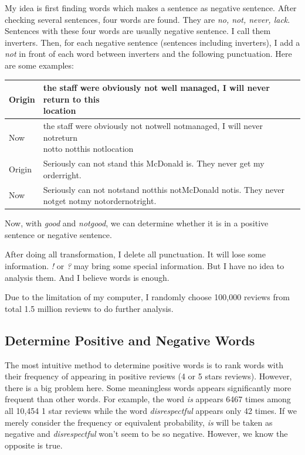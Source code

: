 \documentclass[UTF8]{article}
\begin{document}
My idea is first finding words which makes a sentence as negative sentence. After checking several sentences, four words are found. They are \textit{no, not, never, lack}. Sentences with these four words are usually negative sentence. I call them inverters. Then, for each negative sentence (sentences including inverters), I add a \textit{not} in front of each word between inverters and the following punctuation. Here are some examples:

\begin{table}[]
    \begin{tabular}{|l|l|}
    \hline
    Origin & \makecell{the staff were obviously not well managed, I will never return to this \\location}               
    \\ \hline
    Now    & \makecell{the staff were obviously not notwell notmanaged, I will never notreturn \\notto notthis notlocation }\\ 
    \hline
    Origin & Seriously can not stand this McDonald is. They never get my orderright.  \\ 
    \hline
    Now    & \makecell{Seriously can not notstand notthis notMcDonald notis. They never \\notget notmy notordernotright.}   \\ 
    \hline
    \end{tabular}
\end{table}

\newpage

Now, with \textit{good} and \textit{notgood}, we can determine whether it is in a positive sentence or negative sentence.

After doing all transformation, I delete all punctuation. It will lose some information. \textit{!} or \textit{?} may bring some special information. But I have no idea to analysis them. And I believe words is enough.

Due to the limitation of my computer, I randomly choose 100,000 reviews from total 1.5 million reviews to do further analysis.

\subsection{Determine Positive and Negative Words}

The most intuitive method to determine positive words is to rank words with their frequency of appearing in positive reviews (4 or 5 stars reviews). However, there is a big problem here. Some meaningless words appears significantly more frequent than other words. For example, the word \textit{is} appears 6467 times among all 10,454 1 star reviews while the word \textit{disrespectful} appears only 42 times. If we merely consider the frequency or equivalent probability, \textit{is} will be taken as negative and \textit{disrespectful} won't seem to be so negative. However, we know the opposite is true.
\end{document}
